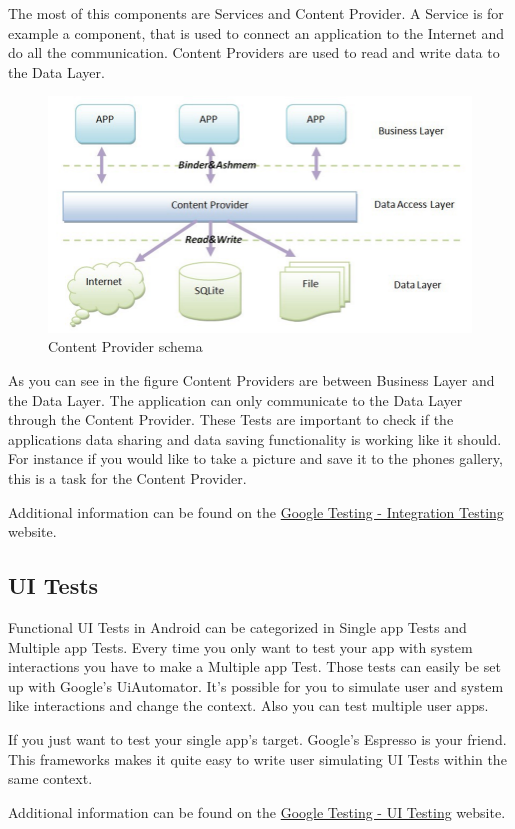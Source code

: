 	The most of this components are Services and Content Provider. A Service is for example a component, that is used to connect an application to the Internet and do all the communication. Content Providers are used to read and write data to the Data Layer.
	
	\begin{figure}[H]
		\centering
		\includegraphics[width=0.6\linewidth]{images/content_provider}
		\caption{Content Provider schema}
		\label{fig:contentprovider}
	\end{figure}

	As you can see in the figure Content Providers are between Business Layer and the Data Layer. The application can only communicate to the Data Layer through the Content Provider. These Tests are important to check if the applications data sharing and data saving functionality is working like it should. For instance if you would like to take a picture and save it to the phones gallery, this is a task for the Content Provider.
	
	Additional information can be found on the \href{https://developer.android.com/training/testing/integration-testing/}{Google Testing - Integration Testing} website.
	
	\subsection{UI Tests}
	Functional UI Tests in Android can be categorized in Single app Tests and Multiple app Tests. Every time you only want to test your app with system interactions you have to make a Multiple app Test. Those tests can easily be set up with Google's UiAutomator. It's possible for you to simulate user and system like interactions and change the context. Also you can test multiple user apps.
	
	If you just want to test your single app's target. Google's Espresso is your friend. This frameworks makes it quite easy to write user simulating UI Tests within the same context.
	
	Additional information can be found on the \href{https://developer.android.com/training/testing/ui-testing/}{Google Testing - UI Testing} website.
	
